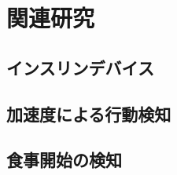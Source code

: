 \chapter{関連研究}
\label{chap:related_works}

\section{インスリンデバイス}

\section{加速度による行動検知}

\section{食事開始の検知}
